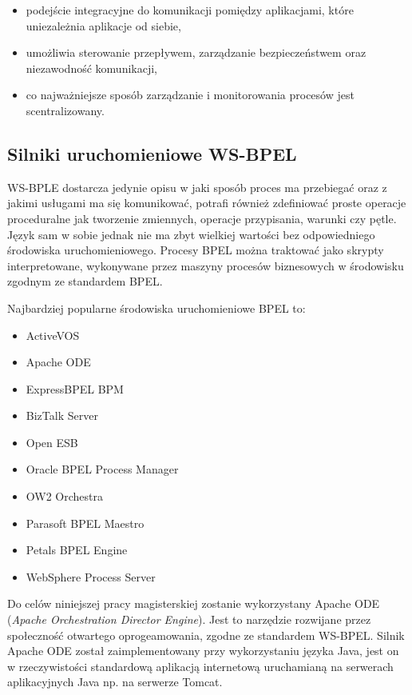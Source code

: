 \begin{itemize}
\item podejście integracyjne do komunikacji pomiędzy aplikacjami, które uniezależnia aplikacje od siebie,  
\item umożliwia sterowanie przepływem, zarządzanie bezpieczeństwem oraz niezawodność komunikacji,
\item co najważniejsze sposób zarządzanie i monitorowania procesów jest scentralizowany. 
\end{itemize}

\subsection{Silniki uruchomieniowe WS-BPEL}
\label{sec:bpelEngines}

WS-BPLE dostarcza jedynie opisu w jaki sposób proces ma przebiegać oraz z jakimi usługami ma się komunikować, potrafi również zdefiniować proste operacje proceduralne jak tworzenie zmiennych, operacje przypisania, warunki czy pętle. Język sam w sobie jednak nie ma zbyt wielkiej wartości bez odpowiedniego środowiska uruchomieniowego. Procesy BPEL można traktować jako skrypty interpretowane, wykonywane przez maszyny procesów biznesowych w środowisku zgodnym ze standardem BPEL. 

Najbardziej popularne środowiska uruchomieniowe BPEL to:

\begin{itemize}
\item ActiveVOS 
\item Apache ODE
\item ExpressBPEL BPM
\item BizTalk Server
\item Open ESB
\item Oracle BPEL Process Manager
\item OW2 Orchestra
\item Parasoft BPEL Maestro
\item Petals BPEL Engine
\item WebSphere Process Server
\end{itemize}

Do celów niniejszej pracy magisterskiej zostanie wykorzystany Apache ODE (\textit{Apache Orchestration Director Engine}). Jest to narzędzie rozwijane przez społeczność otwartego oprogeamowania, zgodne ze standardem WS-BPEL. Silnik Apache ODE został zaimplementowany przy wykorzystaniu języka Java, jest on w rzeczywistości standardową aplikacją internetową uruchamianą na serwerach aplikacyjnych Java np. na serwerze Tomcat. 


